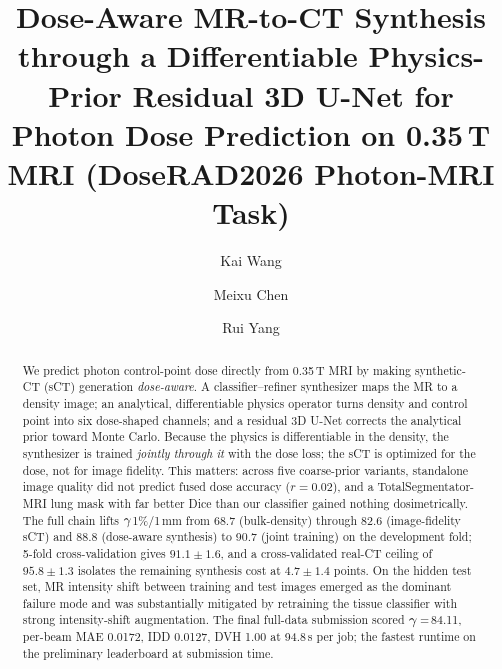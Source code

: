 \documentclass{llncs}
\begin{document}
\title{Dose-Aware MR-to-CT Synthesis through a Differentiable Physics-Prior Residual 3D U-Net
for Photon Dose Prediction on 0.35\,T MRI (DoseRAD2026 Photon-MRI Task)}
\author{Kai Wang \and Meixu Chen \and Rui Yang}

\maketitle

\begin{abstract}
We predict photon control-point dose directly from 0.35\,T MRI by making synthetic-CT (sCT)
generation \emph{dose-aware}. A classifier--refiner synthesizer maps the MR to a density image;
an analytical, differentiable physics operator turns density and control point into six
dose-shaped channels; and a residual 3D U-Net corrects the analytical prior toward Monte Carlo.
Because the physics is differentiable in the density, the synthesizer is trained \emph{jointly
through it} with the dose loss; the sCT is optimized for the dose, not for image fidelity. This
matters: across five coarse-prior variants, standalone image quality did not predict fused dose
accuracy ($r{=}0.02$), and a TotalSegmentator-MRI lung mask with far better Dice than our
classifier gained nothing dosimetrically. The full chain lifts $\gamma$1\%/1\,mm from 68.7
(bulk-density) through 82.6 (image-fidelity sCT) and 88.8 (dose-aware synthesis) to 90.7 (joint
training) on the development fold; 5-fold cross-validation gives $91.1\pm1.6$, and a
cross-validated real-CT ceiling of $95.8\pm1.3$ isolates the remaining synthesis cost at
$4.7\pm1.4$ points. On the hidden test set, MR intensity shift between training and test images
emerged as the dominant failure mode and was substantially mitigated by retraining the tissue
classifier with strong intensity-shift augmentation. The final full-data submission scored
$\gamma$\,=\,84.11, per-beam MAE 0.0172, IDD 0.0127, DVH 1.00 at 94.8\,s per job; the fastest
runtime on the preliminary leaderboard at submission time.
\end{abstract}
\end{document}

